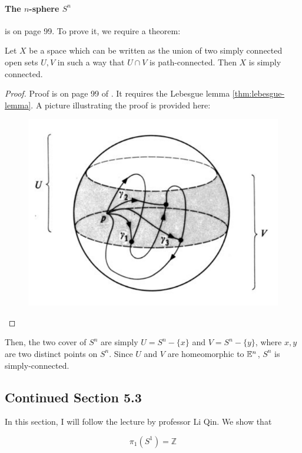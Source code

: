 \paragraph{The $n$-sphere $S^n$} is on page 99. To prove it, we
require a theorem:
\begin{thm}
    Let $X$ be a space which can be written as the union of two simply
    connected open sets $U,V$ in such a way that $U\cap V$ is
    path-connected. Then $X$ is simply connected.
\end{thm}
\begin{proof}
    Proof is on page 99 of \cite{book}. It requires the Lebesgue lemma
    \ref{thm:lebesgue-lemma}. A picture illustrating the proof is
    provided here:
    \begin{figure}[H]
        \centering
        \includegraphics[width=0.6\linewidth]
        {pics/n-sphere-is-simply-con.PNG}
    \end{figure}
\end{proof}
Then, the two cover of $S^n$ are simply $U=S^n-\{x\}$ and
$V=S^n-\{y\}$, where $x,y$ are two distinct points on $S^n$. Since $U$
and $V$ are homeomorphic to $\mathbb{E}^n$, $S^n$ is simply-connected.

\subsection{Continued Section 5.3}
\label{sec:Continued-Section-5.3}
In this section, I will follow the lecture by professor Li Qin.
We show that
\begin{thm}
    $$\pi_1 (S^1) = \mathbb{Z} $$
\end{thm}

